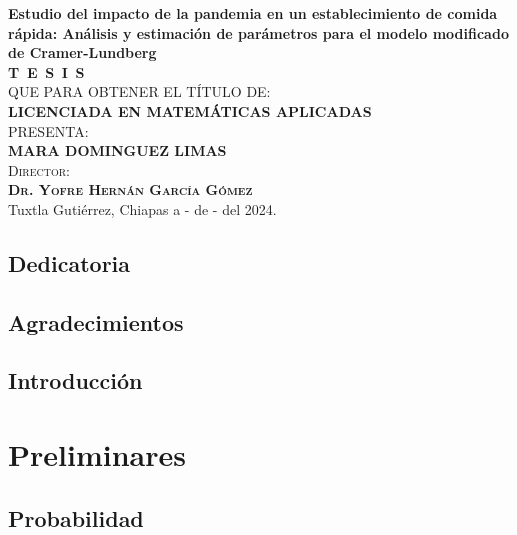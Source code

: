 \documentclass[
  us-letterpaper,
]{scrreprt}
\renewcommand*\contentsname{Tabla de contenidos}
\newcommand\contentsname{Tabla de contenidos}
\theoremstyle{plain}
\theoremstyle{plain}
\theoremstyle{definition}
\theoremstyle{remark}
\begin{document}
\begin{titlepage}
\begin{minipage}[t][0.95\textheight][c]{0.76\textwidth}
            \begin{center}
                {\Large\bfseries Estudio del impacto de la pandemia en un establecimiento de comida rápida: Análisis y estimación de parámetros para el modelo modificado de Cramer-Lundberg}\\[2cm]
                \textsc{\huge \textbf{T\, E\, S\, I\, S}}\\[1.5cm]
                \textsc{\large QUE PARA OBTENER EL TÍTULO DE:}\\[0.3cm]
                \textbf{\textsc{LICENCIADA EN MATEMÁTICAS APLICADAS}}\\[1.5cm]
                \textsc{\large PRESENTA:}\\[0.3cm]
                \textbf{\textsc{\large {MARA DOMINGUEZ LIMAS}}}\\[2cm]
                {\large\scshape Director:\\[0.3cm]
                {\textbf{\large Dr. Yofre Hernán García Gómez }}}\\[2.0cm]
                \large{Tuxtla Gutiérrez, Chiapas a - de - del 2024.}

            \end{center}
\end{minipage}
\end{titlepage}

\pagebreak[2]

\chapter*{Dedicatoria}



\chapter*{Agradecimientos}

\renewcommand*\contentsname{Tabla de contenidos}
{
\hypersetup{linkcolor=}
\setcounter{tocdepth}{2}
\tableofcontents
}

\chapter{Introducción}\label{introducciuxf3n}

\part{Preliminares}

\chapter{Probabilidad}\label{probabilidad}
\end{document}
